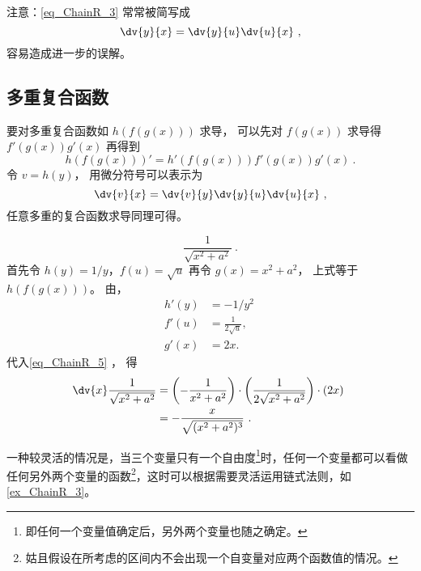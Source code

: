 注意：\autoref{eq_ChainR_3} 常常被简写成
\begin{equation}
\dv{y}{x} = \dv{y}{u} \dv{u}{x}~,
\end{equation}
容易造成进一步的误解。

\subsection{多重复合函数}
要对多重复合函数如 $h(f(g(x)))$ 求导， 可以先对 $f(g(x))$ 求导得 $f'(g(x))g'(x)$ 再得到
\begin{equation}
h(f(g(x)))' = h'(f(g(x)))f'(g(x))g'(x)~.
\end{equation}
令 $v = h(y)$， 用微分符号可以表示为
\begin{equation}
\dv{v}{x} = \dv{v}{y}\dv{y}{u}\dv{u}{x}~,
\end{equation}
任意多重的复合函数求导同理可得。

\begin{example}{}
\begin{equation}
\frac{1}{\sqrt{x^2+a^2}}~.
\end{equation}
首先令 $h(y) = 1/y$，$f(u) = \sqrt{u}$ 再令 $g(x) = x^2+a^2$， 上式等于 $h(f(g(x)))$。 由，
\begin{equation}
\begin{aligned}
h'(y) &= - 1/y^2 \\
f'(u) &=  \frac{1}{2 \sqrt{u}}, \\
g'(x) &= 2x.
\end{aligned}~
\end{equation}
代入\autoref{eq_ChainR_5} ， 得
\begin{equation}
\begin{aligned}
\dv{x} \frac{1}{\sqrt{x^2+a^2}} &= \left(- {1 \over x^2 + a^2}\right) \cdot \left( {1 \over 2 \sqrt{x^2 + a^2}} \right) \cdot \left( 2 x \right) \\
&= -\frac{x}{\sqrt{(x^2+a^2)^3}}~.
\end{aligned}~
\end{equation}

\end{example}

一种较灵活的情况是，当三个变量只有一个自由度\footnote{即任何一个变量值确定后，另外两个变量也随之确定。}时，任何一个变量都可以看做任何另外两个变量的函数\footnote{姑且假设在所考虑的区间内不会出现一个自变量对应两个函数值的情况。}，这时可以根据需要灵活运用链式法则，如\autoref{ex_ChainR_3}。

